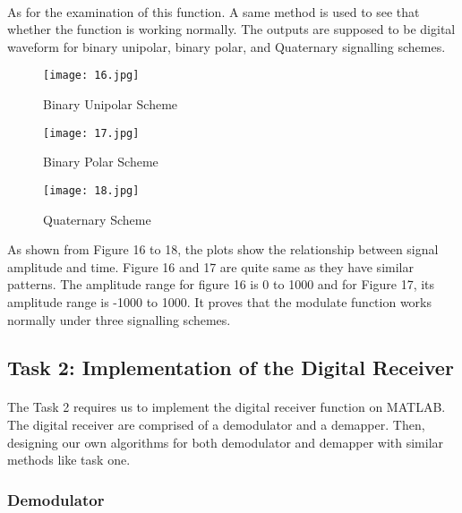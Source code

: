 \documentclass[12pt]{article}
\begin{document}
    \paragraph{}
    As for the examination of this function. A same method is used to see that whether the function is working normally. The outputs are supposed to be digital waveform for binary unipolar, binary polar, and Quaternary signalling schemes.
    \begin{figure}[htbp]
    \begin{minipage}[t]{0.3\linewidth}
    \centering
    \texttt{[image: 16.jpg]}
    \caption{Binary Unipolar Scheme}
    \label{fig:side:a}
    \end{minipage}
    \begin{minipage}[t]{0.3\linewidth}
    \centering
    \texttt{[image: 17.jpg]}
    \caption{Binary Polar Scheme}
    \end{minipage}
    \begin{minipage}[t]{0.3\linewidth}
    \centering
    \texttt{[image: 18.jpg]}
    \caption{Quaternary Scheme}
    \label{}
    \end{minipage}
    \end{figure}
    As shown from Figure 16 to 18, the plots show the relationship between signal amplitude and time. Figure 16 and 17 are quite same as they have similar patterns. The amplitude range for figure 16 is 0 to 1000 and for Figure 17, its amplitude range is -1000 to 1000. It proves that the modulate function works normally under three signalling schemes.
    
    

    
    \subsection{Task 2: Implementation of the Digital Receiver}
    \paragraph{}
    The Task 2 requires us to implement the digital receiver function on MATLAB. The digital receiver are comprised of a demodulator and a demapper. Then, designing our own algorithms for both demodulator and demapper with similar methods like task one.
    \subsubsection{Demodulator}
\end{document}
